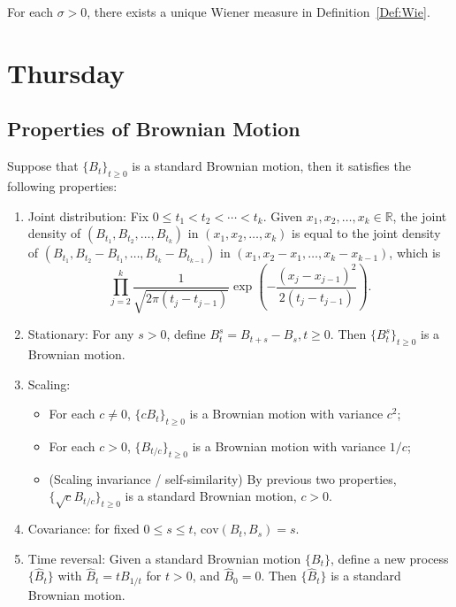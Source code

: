 \begin{theorem}
For each $\sigma>0$, there exists a unique Wiener measure in Definition~\ref{Def:Wie}.
\end{theorem}
\section{Thursday}
\subsection{Properties of Brownian Motion}
\begin{proposition}
Suppose that $\{B_t\}_{t\ge0}$ is a standard Brownian motion, then it satisfies the following properties:
\begin{enumerate}
\item
Joint distribution:
Fix $0\le t_1<t_2<\cdots<t_k$.
Given $x_1,x_2,\ldots,x_k\in\mathbb{R}$, the joint density of 
$(B_{t_1},B_{t_2},\ldots,B_{t_k})$ in $(x_1,x_2,\ldots,x_k)$
is equal to the joint density of 
$(B_{t_1},B_{t_2}-B_{t_1},\ldots,B_{t_k}-B_{t_{k-1}})$ in $(x_1,x_2-x_1,\ldots,x_k-x_{k-1})$,
which is
\[
\prod_{j=2}^k\frac{1}{\sqrt{2\pi(t_j - t_{j-1})}}\exp\left(-\frac{(x_j-x_{j-1})^2}{2(t_j - t_{j-1})}\right).
\]
\item
Stationary:
For any $s>0$, define $B_t^s = B_{t+s} - B_s, t\ge0$.
Then $\{B_t^s\}_{t\ge0}$ is a Brownian motion.
\item
Scaling:
\begin{itemize}
\item
For each $c\ne0$, $\{cB_t\}_{t\ge0}$ is a Brownian motion with variance $c^2$;
\item
For each $c>0$, $\{B_{t/c}\}_{t\ge0}$ is a Brownian motion with variance $1/c$;
\item
(Scaling invariance / self-similarity) By previous two properties,
$\{\sqrt{c}B_{t/c}\}_{t\ge0}$ is a standard Brownian motion, $c>0$.
\end{itemize}
\item
Covariance: for fixed $0\le s\le t$, $\text{cov}(B_t,B_s)=s$.
\item
Time reversal: 
Given a standard Brownian motion $\{B_t\}$,
define a new process $\{\hat{B}_t\}$ with $\hat{B}_t = tB_{1/t}$ for $t>0$, and
$\hat{B}_0=0$. 
Then $\{\hat{B}_t\}$ is a standard Brownian motion.
\end{enumerate}
\end{proposition}
